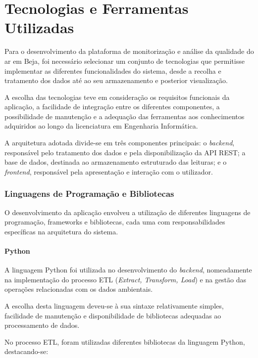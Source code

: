 \chapter{Tecnologias e Ferramentas Utilizadas}
\label{sec:tecnologias}

Para o desenvolvimento da plataforma de monitorização e análise
da qualidade do ar em Beja, foi necessário selecionar um conjunto
de tecnologias que permitisse implementar as diferentes
funcionalidades do sistema, desde a recolha e tratamento dos dados
até ao seu armazenamento e posterior visualização.

A escolha das tecnologias teve em consideração os requisitos
funcionais da aplicação, a facilidade de integração entre os
diferentes componentes, a possibilidade de manutenção e a
adequação das ferramentas aos conhecimentos adquiridos ao longo
da licenciatura em Engenharia Informática.

A arquitetura adotada divide-se em três componentes principais:
o \textit{backend}, responsável pelo tratamento dos dados e
pela disponibilização da API REST; a base de dados, destinada
ao armazenamento estruturado das leituras; e o
\textit{frontend}, responsável pela apresentação e interação
com o utilizador.


\subsection{Linguagens de Programação e Bibliotecas}
\label{subsec:linguagens}

O desenvolvimento da aplicação envolveu a utilização de
diferentes linguagens de programação, frameworks e bibliotecas,
cada uma com responsabilidades específicas na arquitetura
do sistema.


\subsubsection{Python}

A linguagem Python foi utilizada no desenvolvimento do
\textit{backend}, nomeadamente na implementação do processo
ETL (\textit{Extract, Transform, Load}) e na gestão das
operações relacionadas com os dados ambientais.

A escolha desta linguagem deveu-se à sua sintaxe relativamente
simples, facilidade de manutenção e disponibilidade de
bibliotecas adequadas ao processamento de dados.

No processo ETL, foram utilizadas diferentes bibliotecas
da linguagem Python, destacando-se:

